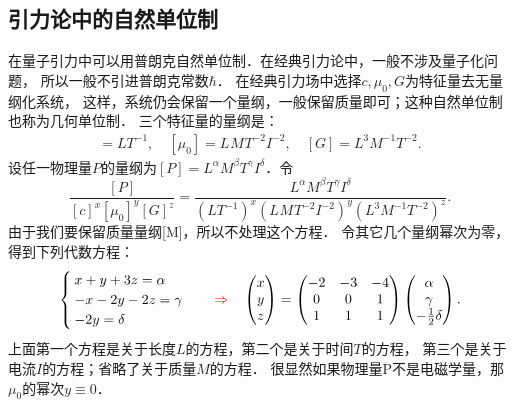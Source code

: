 \subsection{引力论中的自然单位制}\label{chunit-dim:sec_gravity}
在量子引力中可以用普朗克自然单位制．在经典引力论中，一般不涉及量子化问题，
所以一般不引进普朗克常数$\hbar$．
在经典引力场中选择$c,\mu_0, G$为特征量去无量纲化系统，
这样，系统仍会保留一个量纲，一般保留质量即可；这种自然单位制也称为{\heiti 几何单位制}．
三个特征量的量纲是：
\begin{align*}
[c] = \si{LT^{-1}}, \quad [\mu_0] = \si{L^{}M^{}T^{-2}I^{-2}},  \quad [G] = \si{L^{3}M^{-1}T^{-2}} .
\end{align*}
设任一物理量$P$的量纲为$[P]=\si{L}^\alpha \si{M}^\beta \si{T}^\gamma \si{I}^\delta$．令
\begin{equation}\label{chunit-dim:eqn_dimensionless-gravity-0}
\dfrac{[P]}{[c]^x[\mu_0]^y[G]^z}
= \frac{\si{L}^\alpha \si{M}^\beta \si{T}^\gamma \si{I}^\delta}
{(\si{LT^{-1}})^x (\si{L^{}M^{}T^{-2}I^{-2}})^y (\si{L^{3}M^{-1}T^{-2}})^z } .
\end{equation}  %
由于我们要保留质量量纲[\si{M}]，所以不处理这个方程．
令其它几个量纲幂次为零，得到下列代数方程：
\begin{equation}\label{chunit-dim:eqn_dimensionless-gravity-1}
\begin{cases}
{x+y+3z = \alpha } \\
{-x-2y-2z = \gamma } \\
{ - 2y = \delta }
\end{cases}  \quad {\color{red}\Rightarrow} \quad
\begin{pmatrix}
x \\   y \\     z
\end{pmatrix}  =  \begin{pmatrix}
-2&-3&-4 \\
0&0&1 \\
1&1&1
\end{pmatrix} \begin{pmatrix}
\alpha  \\   \gamma  \\    - \frac{1}{2}\delta
\end{pmatrix}.
\end{equation}
上面第一个方程是关于长度$\si{L}$的方程，第二个是关于时间$\si{T}$的方程，
第三个是关于电流$\si{I}$的方程；省略了关于质量$\si{M}$的方程．
很显然如果物理量\si{P}不是电磁学量，那$\mu_0$的幂次$y\equiv 0$．

